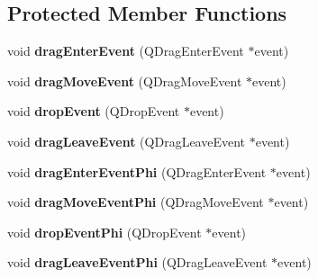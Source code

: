 \subsection*{Protected Member Functions}
\begin{DoxyCompactItemize}
\item 
\hypertarget{classofeli_1_1_image_viewer_a534816218e53e993891b18a56f3fb3e1}{void {\bfseries drag\-Enter\-Event} (Q\-Drag\-Enter\-Event $\ast$event)}\label{classofeli_1_1_image_viewer_a534816218e53e993891b18a56f3fb3e1}

\item 
\hypertarget{classofeli_1_1_image_viewer_ac5e25abaf42c29c8df4814c61b2be553}{void {\bfseries drag\-Move\-Event} (Q\-Drag\-Move\-Event $\ast$event)}\label{classofeli_1_1_image_viewer_ac5e25abaf42c29c8df4814c61b2be553}

\item 
\hypertarget{classofeli_1_1_image_viewer_a866fe8cf08568642676a0a2de31bb1ab}{void {\bfseries drop\-Event} (Q\-Drop\-Event $\ast$event)}\label{classofeli_1_1_image_viewer_a866fe8cf08568642676a0a2de31bb1ab}

\item 
\hypertarget{classofeli_1_1_image_viewer_aa75d3565d22b17c3f9d29b28feacd370}{void {\bfseries drag\-Leave\-Event} (Q\-Drag\-Leave\-Event $\ast$event)}\label{classofeli_1_1_image_viewer_aa75d3565d22b17c3f9d29b28feacd370}

\item 
\hypertarget{classofeli_1_1_image_viewer_a613695ca0cceff6220ab5bee6304a552}{void {\bfseries drag\-Enter\-Event\-Phi} (Q\-Drag\-Enter\-Event $\ast$event)}\label{classofeli_1_1_image_viewer_a613695ca0cceff6220ab5bee6304a552}

\item 
\hypertarget{classofeli_1_1_image_viewer_a7c9d809ba8cfc00bb29f2d7a1e36ffb3}{void {\bfseries drag\-Move\-Event\-Phi} (Q\-Drag\-Move\-Event $\ast$event)}\label{classofeli_1_1_image_viewer_a7c9d809ba8cfc00bb29f2d7a1e36ffb3}

\item 
\hypertarget{classofeli_1_1_image_viewer_a214c884162fd9a9f177b4b1b9d369612}{void {\bfseries drop\-Event\-Phi} (Q\-Drop\-Event $\ast$event)}\label{classofeli_1_1_image_viewer_a214c884162fd9a9f177b4b1b9d369612}

\item 
\hypertarget{classofeli_1_1_image_viewer_a14d04be231f87451ca23b8673328dddf}{void {\bfseries drag\-Leave\-Event\-Phi} (Q\-Drag\-Leave\-Event $\ast$event)}\label{classofeli_1_1_image_viewer_a14d04be231f87451ca23b8673328dddf}


\end{DoxyCompactItemize}
